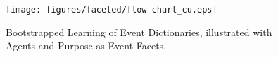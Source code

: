 
\begin{figure}[htbp]
 \centering
  \texttt{[image: figures/faceted/flow-chart\_cu.eps]}
 \caption{Bootstrapped Learning of Event Dictionaries, illustrated with Agents and Purpose as Event Facets.}
\label{multi_faceted_flow_chart}
\end{figure} 


